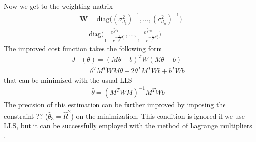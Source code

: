 \documentclass[12pt,twoside]{report}
\begin{document}
Now we get to the weighting matrix
\begin{align}
    &\mathbf{W}=\text{diag}\big((\sigma^2_{d_1})^{-1},...,(\sigma^2_{d_n})^{-1}\big)\\
    &=\text{diag}\bigg(\frac{e^{\frac{4}{\beta}\nu_1}}{1-e^{-\frac{4}{\beta^2}\sigma^2_1}},...,\frac{e^{\frac{4}{\beta}\nu_n}}{1-e^{-\frac{4}{\beta^2}\sigma^2_n}}\bigg)
\end{align}
The improved cost function \cite{rzk} takes the following form 
\begin{align}
    J&(\theta)=(M\theta - b)^TW(M\theta - b)\\
    &=\theta^TM^TWM\theta-2\theta^TM^TWb+b^TWb
\end{align}
that can be minimized with the usual LLS
\begin{align}
    \hat{\theta}=(M^TWM)^{-1}M^TWb
\end{align}
The precision of this estimation can be further improved by imposing the constraint ?? ($\hat{\theta}_3=\hat{R}^2$) on the minimization. This condition is ignored if we use LLS, but it can be successfully employed with the method of Lagrange multipliers \cite{1275684,Lopez1994, pasa}.


\clearpage
\end{document}
